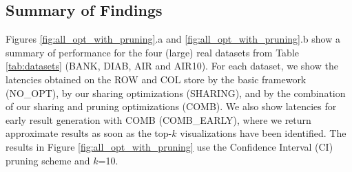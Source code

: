 

\subsection{Summary of Findings}
\label{sec:expt_summary}

Figures \ref{fig:all_opt_with_pruning}.a and \ref{fig:all_opt_with_pruning}.b show a summary of \SeeDB performance for the four 
(large) real datasets from Table \ref{tab:datasets} (BANK, DIAB, AIR and AIR10).
For each dataset, we show the latencies obtained on the ROW and COL store by the basic \SeeDB framework (NO\_OPT), 
by our sharing optimizations (SHARING), and by the combination of our sharing and pruning optimizations (COMB). 
We also show latencies for early result generation with COMB (COMB\_EARLY), where we return approximate results 
as soon as the top-$k$ visualizations have been identified.
The results in Figure \ref{fig:all_opt_with_pruning} 
use the Confidence Interval (CI) pruning scheme and $k$=10. 




